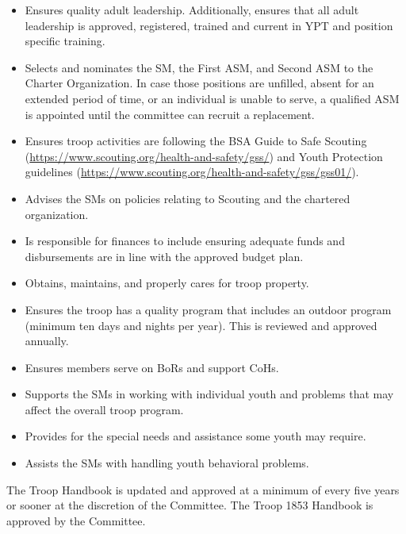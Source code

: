 \documentclass{ltxguide}
\begin{document}
\begin{itemize}
	\item Ensures quality adult leadership. Additionally, ensures that all adult leadership is approved, registered, trained and current in \ac{YPT} and position specific training.

	\item Selects and nominates the \ac{SM}, the First \ac{ASM}, and Second \ac{ASM} to the Charter Organization. In case those positions are unfilled, absent for an extended period of time, or an individual is unable to serve, a qualified \ac{ASM} is appointed until the committee can recruit a replacement.

	\item Ensures troop activities are following the \ac{BSA} Guide to Safe Scouting (\url{https://www.scouting.org/health-and-safety/gss/}) and Youth Protection guidelines (\url{https://www.scouting.org/health-and-safety/gss/gss01/}).

	\item Advises the \acp{SM} on policies relating to Scouting and the chartered organization.

	\item Is responsible for finances to include ensuring adequate funds and disbursements are in line with the approved budget plan.

	\item Obtains, maintains, and properly cares for troop property.

	\item Ensures the troop has a quality program that includes an outdoor program (minimum ten days and nights per year). This is reviewed and approved annually.

	\item Ensures members serve on \acp{BoR} and support \acp{CoH}.

	\item Supports the \acp{SM} in working with individual youth and problems that may affect the overall troop program.

	\item Provides for the special needs and assistance some youth may require.

	\item Assists the \acp{SM} with handling youth behavioral problems.
\end{itemize}
The Troop Handbook is updated and approved at a minimum of every five years or sooner at the discretion of the Committee. The Troop 1853 Handbook is approved by the Committee.
\end{document}
